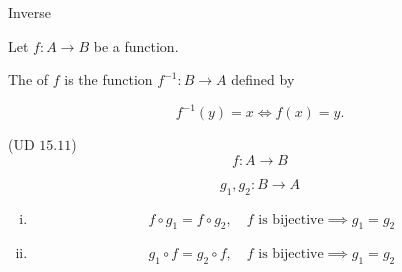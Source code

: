 \begin{frame}{}
  \centerline{\LARGE Inverse}

  \begin{definition}[Inverse]
    Let $f: A \to B$ be a  function.

    The  of $f$ is the function $f^{-1}: B \to A$ defined by

    \[
      f^{-1}(y) = x \iff f(x) = y.
    \]
  \end{definition}
\end{frame}

\begin{frame}{}
  \begin{exampleblock}{(UD $15.11$)}
    \[
      f: A \to B
    \]

    \[
      g_1, g_2: B \to A
    \]

    \begin{enumerate}[(i)]
      \item 
	\[
	  f \circ g_1 = f \circ g_2, \quad f \text{ is bijective} \implies g_1 = g_2
	\]
      \item 
	\[
	  g_1 \circ f = g_2 \circ f, \quad f \text{ is bijective} \implies g_1 = g_2
	\]
    \end{enumerate}
  \end{exampleblock}
\end{frame}

